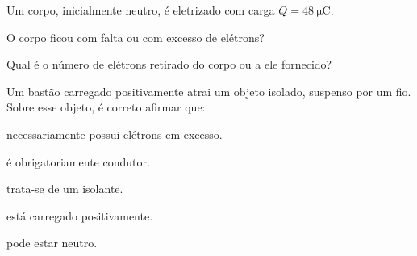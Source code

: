\begin{questao}[1]{}

Um corpo, inicialmente neutro, é eletrizado com carga $Q = \SI{48}{\micro\coulomb}$.
\begin{itensq}
\item O corpo ficou com falta ou com excesso de elétrons?
\item Qual é o número de elétrons retirado do corpo ou a ele fornecido?
\end{itensq}


\end{questao}
\begin{questao}[1]{}

Um bastão carregado positivamente atrai um objeto isolado, suspenso por um fio.
Sobre esse objeto, é correto afirmar que:
\begin{alternativas}
\item necessariamente possui elétrons em excesso.
\item é obrigatoriamente condutor.
\item trata-se de um isolante.
\item está carregado positivamente.
\item pode estar neutro.
\end{alternativas}


\end{questao}

